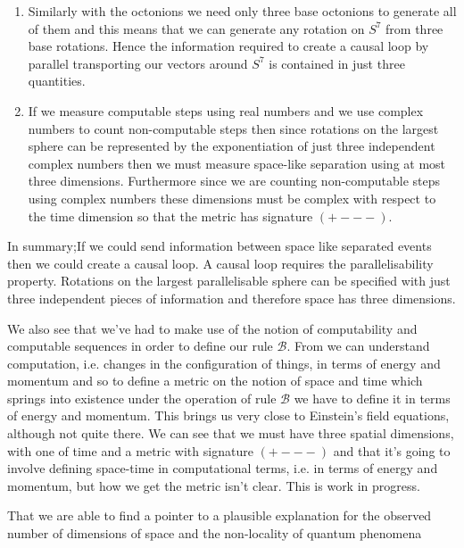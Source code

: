 \documentclass[
   ,final            %
  ]
  {aipproc}
\begin{document}
\begin{enumerate}[(1)]
\begin{equation}
i^2=j^2=k^2=ijk=-1
\end{equation} 
from which we deduce that
\begin{equation}
ij=k
\end{equation}
so we only need two base quaterions to create the full set. 
\item
Similarly with the octonions we need only three base octonions to generate all of them and this means that we can generate any rotation on $S^7$ from %
three base rotations. Hence the information required to create a causal loop by parallel transporting our vectors around $S^7$ is contained in just %
three quantities.
\item
If we measure computable steps using real numbers and we use complex numbers to count non-computable steps then since rotations on the largest sphere %
can be represented by the exponentiation of just three independent complex numbers then we must measure space-like separation using at most three %
dimensions. Furthermore since we are counting non-computable steps using complex numbers these dimensions must be complex with respect to the time %
dimension so that the metric has signature $(+---)$. 
\end{enumerate}
\par
In summary;If we could send information between space like separated events then we could create a causal loop. A causal loop requires the %
parallelisability property. Rotations on the largest parallelisable sphere can be specified with just three independent pieces of information and %
therefore space has three dimensions.
\par
We also see that we've had to make use of the notion of computability and computable sequences in order to define our rule $\mathcal{B}$. From %
\citet{Margolus_03} we can understand computation, i.e. changes in the configuration of things, in terms of energy and momentum and so to define a %
metric on the notion of space and time which springs into existence under the operation of rule $\mathcal{B}$ we have to define it in terms of energy %
and momentum. This brings us very close to Einstein's field equations, although not quite there. We can see that we must have three spatial %
dimensions, with one of time and a metric with signature $(+---)$ and that it's going to involve defining space-time in computational terms, i.e. in %
terms of energy and momentum, but how we get the metric isn't clear. This is work in progress.
\par 
That we are able to find a pointer to a plausible explanation for the observed number of dimensions of space and the non-locality of quantum phenomena %
\end{document}
